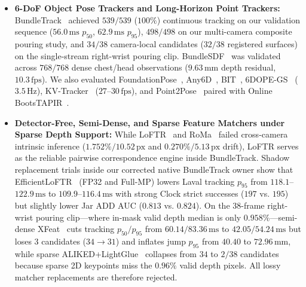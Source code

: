 \documentclass[10pt,journal]{IEEEtran}
\begin{document}
\begin{itemize}
    \item \textbf{6-DoF Object Pose Trackers and Long-Horizon Point Trackers:} BundleTrack~\cite{wen2021bundletrack} achieved $539/539$ ($100\%$) continuous tracking on our validation sequence ($56.0\,\mathrm{ms}$ $p_{50}$, $62.9\,\mathrm{ms}$ $p_{95}$), $498/498$ on our multi-camera composite pouring study, and $34/38$ camera-local candidates ($32/38$ registered surfaces) on the single-stream right-wrist pouring clip. BundleSDF~\cite{wen2023bundlesdf} was validated across $768/768$ dense chest/head observations ($9.63\,\mathrm{mm}$ depth residual, $10.3\,\mathrm{fps}$). We also evaluated FoundationPose~\cite{wen2024foundationpose}, Any6D~\cite{lee2025any6d}, BIT~\cite{song2025bit}, 6DOPE-GS~\cite{jin20256dopegs} ($3.5\,\mathrm{Hz}$), KV-Tracker~\cite{elich2026kvtracker} ($27$--$30\,\mathrm{fps}$), and Point2Pose~\cite{point2pose2026} paired with Online BootsTAPIR~\cite{doersch2024bootstap}.
    \item \textbf{Detector-Free, Semi-Dense, and Sparse Feature Matchers under Sparse Depth Support:} While LoFTR~\cite{sun2021loftr} and RoMa~\cite{edstedt2024roma} failed cross-camera intrinsic inference ($1.752\% / 10.52\,\mathrm{px}$ and $0.270\% / 5.13\,\mathrm{px}$ drift), LoFTR serves as the reliable pairwise correspondence engine inside BundleTrack. Shadow replacement trials inside our corrected native BundleTrack owner show that EfficientLoFTR~\cite{wang2024eloftr} (FP32 and Full-MP) lowers Laval tracking $p_{95}$ from $118.1$--$122.9\,\mathrm{ms}$ to $109.9$--$116.4\,\mathrm{ms}$ with strong Clock strict successes ($197$ vs. $195$) but slightly lower Jar ADD AUC ($0.813$ vs. $0.824$). On the $38$-frame right-wrist pouring clip---where in-mask valid depth median is only $0.958\%$---semi-dense XFeat~\cite{potje2024xfeat} cuts tracking $p_{50}/p_{95}$ from $60.14/83.36\,\mathrm{ms}$ to $42.05/54.24\,\mathrm{ms}$ but loses $3$ candidates ($34 \to 31$) and inflates jump $p_{95}$ from $40.40$ to $72.96\,\mathrm{mm}$, while sparse ALIKED+LightGlue~\cite{zhao2023aliked,lindenberger2023lightglue} collapses from $34$ to $2/38$ candidates because sparse 2D keypoints miss the $0.96\%$ valid depth pixels. All lossy matcher replacements are therefore rejected.
\end{itemize}
\end{document}
